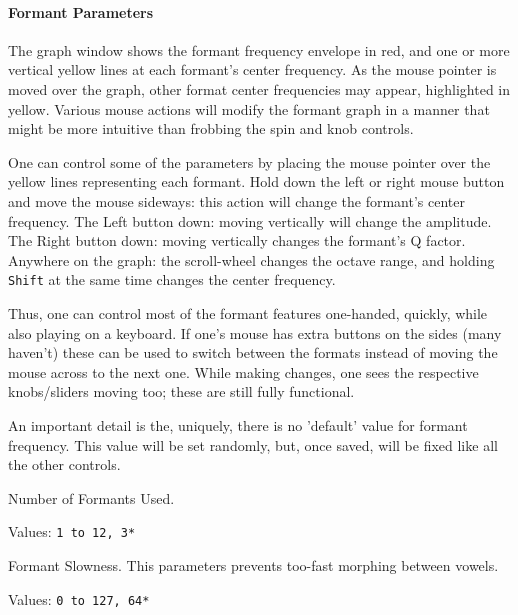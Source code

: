 \paragraph{Formant Parameters}
\label{paragraph:formant_parameters}

   The graph window shows the formant frequency envelope in red,
   and one or more vertical yellow lines at each formant's center frequency.
   As the mouse pointer is moved over the graph, other format center
   frequencies may appear, highlighted in yellow.
   Various mouse actions will modify the formant graph in a manner that might
   be more intuitive than frobbing the spin and knob controls.

   One can control some of the parameters by placing the mouse pointer over
   the yellow lines representing each formant.
   Hold down the left or right mouse button and move the mouse sideways:
   this action will change the formant's center frequency.
   The Left button down: moving vertically will change the amplitude.
   The Right button down: moving vertically changes the formant's Q factor.
   Anywhere on the graph: the scroll-wheel changes the octave range, and
   holding \texttt{Shift} at the same time changes the center frequency.

   Thus, one can control most of the formant features one-handed, quickly,
   while also playing on a keyboard.
   If one's mouse has extra buttons on the sides (many haven't) these can
   be used to switch between the formats instead of moving the mouse across
   to the next one.
   While making changes, one sees the respective knobs/sliders moving
   too; these are still fully functional.

   An important detail is the, uniquely, there is no 'default' value for
   formant frequency. This value will be set randomly, but, once saved, will be
   fixed like all the other controls.

   Number of Formants Used.

   Values:  \texttt{1 to 12, 3*}

   Formant Slowness.
   This parameters prevents too-fast morphing between vowels.

   Values:  \texttt{0 to 127, 64*}

